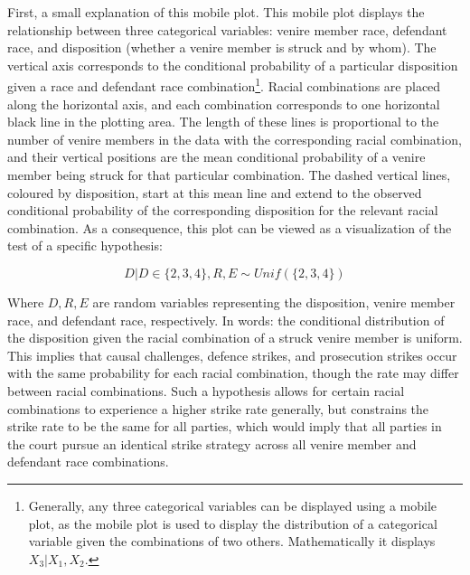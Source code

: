First, a small explanation of this mobile plot. This mobile plot displays the relationship between three categorical variables:
venire member race, defendant race, and disposition (whether a venire member is struck and by whom). The vertical axis corresponds
to the conditional probability of a particular disposition given a race and defendant race combination\footnote{Generally, any three
  categorical variables can be displayed using a mobile plot, as the mobile plot is used to display the distribution of a
  categorical variable given the combinations of two others. Mathematically it displays $X_3|X_1,X_2$.}. Racial combinations
are placed along the horizontal axis, and each combination corresponds to one horizontal black line in the plotting area. The
length of these lines is proportional to the number of venire members in the data with the corresponding racial combination, and
their vertical positions are the mean conditional probability of a
venire member being struck for that particular combination. The dashed vertical lines, coloured by disposition, start at this mean line and
extend to the observed conditional probability of the corresponding disposition for the relevant racial combination. As a
consequence, this plot can be viewed as a visualization of the test of a specific hypothesis:

\begin{equation}
  \label{eq:vishyp}
  D | D \in \{2,3,4\}, R, E \sim Unif(\{2,3,4\})
\end{equation}

Where $D, R, E$ are random variables representing the disposition, venire member race, and defendant race, respectively. In words: the conditional distribution of the
disposition given the racial combination of a struck venire member is uniform. This implies that causal challenges, defence strikes, and prosecution strikes occur with the same probability for each
racial combination, though the rate may differ between racial combinations. Such a hypothesis allows for certain racial
combinations to experience a higher strike rate generally, but constrains the strike rate to be the same for all parties, which
would imply that all parties in the court pursue an identical strike strategy across all venire member and defendant race
combinations.

